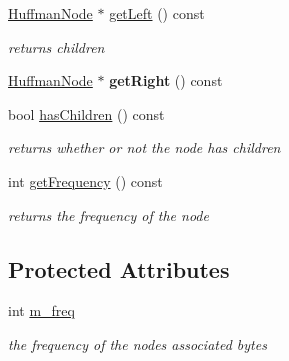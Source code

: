 \begin{DoxyCompactItemize}
\hyperlink{classnta_1_1HuffmanNode}{Huffman\+Node} $\ast$ \hyperlink{classnta_1_1HuffmanNode_a2f67fd062ac5079cd40a0a82352d5a45}{get\+Left} () const
\begin{DoxyCompactList}\small\item\em returns children \end{DoxyCompactList}\item 
\mbox{\label{classnta_1_1HuffmanNode_a3be8400f944090f38c48b17e890e5105}} 
\hyperlink{classnta_1_1HuffmanNode}{Huffman\+Node} $\ast$ {\bfseries get\+Right} () const
\item 
\mbox{\label{classnta_1_1HuffmanNode_a429374a0e433063935f6e86816be8831}} 
bool \hyperlink{classnta_1_1HuffmanNode_a429374a0e433063935f6e86816be8831}{has\+Children} () const
\begin{DoxyCompactList}\small\item\em returns whether or not the node has children \end{DoxyCompactList}\item 
\mbox{\label{classnta_1_1HuffmanNode_aaae7f78797726f30ce584e6fd0a282c1}} 
int \hyperlink{classnta_1_1HuffmanNode_aaae7f78797726f30ce584e6fd0a282c1}{get\+Frequency} () const
\begin{DoxyCompactList}\small\item\em returns the frequency of the node \end{DoxyCompactList}\end{DoxyCompactItemize}
\subsection*{Protected Attributes}
\begin{DoxyCompactItemize}
\item 
\mbox{\label{classnta_1_1HuffmanNode_acba67dc4c5cda81fa4f761a314b57d86}} 
int \hyperlink{classnta_1_1HuffmanNode_acba67dc4c5cda81fa4f761a314b57d86}{m\+\_\+freq}
\begin{DoxyCompactList}\small\item\em the frequency of the nodes associated bytes \end{DoxyCompactList}\end{DoxyCompactItemize}
